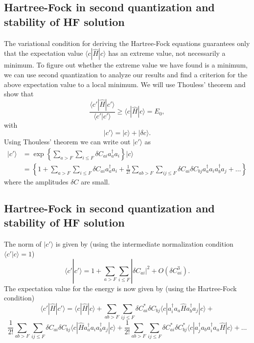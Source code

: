 \documentclass[%
twoside,                 %
final,                   %
10pt]{article}
\begin{document}
\subsection*{Hartree-Fock in second quantization and stability of HF solution}

\paragraph{}
The variational condition for deriving the Hartree-Fock equations guarantees only that the expectation value $\langle c | \hat{H} | c \rangle$ has an extreme value, not necessarily a minimum. To figure out whether the extreme value we have found  is a minimum, we can use second quantization to analyze our results and find a criterion 
for the above expectation value to a local minimum. We will use Thouless' theorem and show that
\[
\frac{\langle c' |\hat{H} | c'\rangle}{\langle c' |c'\rangle} \ge \langle c |\hat{H} | c\rangle= E_0,
\]
with
\[
 {|c'\rangle} = {|c\rangle + |\delta c\rangle}.
\]
Using Thouless' theorem we can write out ${|c'\rangle}$ as
\begin{align}
 {|c'\rangle}&=\exp\left\{\sum_{a > F}\sum_{i \le F}\delta C_{ai}a_{a}^{\dagger}a_{i}\right\}| c\rangle\\ 
&=\left\{1+\sum_{a > F}\sum_{i \le F}\delta C_{ai}a_{a}^{\dagger}
a_{i}+\frac{1}{2!}\sum_{ab > F}\sum_{ij \le F}\delta C_{ai}\delta C_{bj}a_{a}^{\dagger}a_{i}a_{b}^{\dagger}a_{j}+\dots\right\}
\end{align}
where the amplitudes $\delta C$ are small.



\subsection*{Hartree-Fock in second quantization and stability of HF solution}

\paragraph{}

The norm of $|c'\rangle$ is given by (using the intermediate normalization condition $\langle c' |c\rangle=1$) 
\[
\langle c' | c'\rangle = 1+\sum_{a>F}
\sum_{i\le F}|\delta C_{ai}|^2+O(\delta C_{ai}^3).
\]
The expectation value for the energy is now given by (using the Hartree-Fock condition)
\[
\langle c' |\hat{H} | c'\rangle=\langle c |\hat{H} | c\rangle +
\sum_{ab>F}
\sum_{ij\le F}\delta C_{ai}^*\delta C_{bj}\langle c |a_{i}^{\dagger}a_{a}\hat{H}a_{b}^{\dagger}a_{j}|c\rangle+
\]
\[
\frac{1}{2!}\sum_{ab>F}
\sum_{ij\le F}\delta C_{ai}\delta C_{bj}\langle c |\hat{H}a_{a}^{\dagger}a_{i}a_{b}^{\dagger}a_{j}|c\rangle+\frac{1}{2!}\sum_{ab>F}
\sum_{ij\le F}\delta C_{ai}^*\delta C_{bj}^*\langle c|a_{j}^{\dagger}a_{b}a_{i}^{\dagger}a_{a}\hat{H}|c\rangle
+\dots
\]
\end{document}
